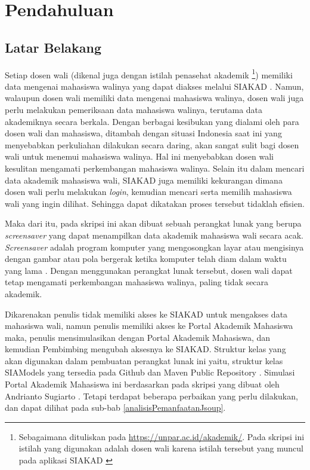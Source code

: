 \chapter{Pendahuluan}
\label{chap:intro}
   
\section{Latar Belakang}
\label{sec:label}

Setiap dosen wali (dikenal juga dengan istilah penasehat akademik \footnote{Sebagaimana dituliskan pada \url{https://unpar.ac.id/akademik/}. Pada skripsi ini istilah yang digunakan adalah dosen wali karena istilah tersebut yang muncul pada aplikasi SIAKAD \cite{siakad}}) memiliki data mengenai mahasiswa walinya yang dapat diakses melalui SIAKAD \cite{siakad}. Namun, walaupun dosen wali memiliki data mengenai mahasiswa walinya, dosen wali juga perlu melakukan pemeriksaan data mahasiswa walinya, terutama data akademiknya secara berkala. Dengan berbagai kesibukan yang dialami oleh para dosen wali dan mahasiswa, ditambah dengan situasi Indonesia saat ini yang menyebabkan perkuliahan dilakukan secara daring, akan sangat sulit bagi dosen wali untuk menemui mahasiswa walinya. Hal ini menyebabkan dosen wali kesulitan mengamati perkembangan mahasiswa walinya. Selain itu dalam mencari data akademik mahasiswa wali, SIAKAD juga memiliki kekurangan dimana dosen wali perlu melakukan \textit{login}, kemudian mencari serta memilih mahasiswa wali yang ingin dilihat. Sehingga dapat dikatakan proses tersebut tidaklah efisien.

Maka dari itu, pada skripsi ini akan dibuat sebuah perangkat lunak yang berupa \textit{screensaver} yang dapat menampilkan data akademik mahasiswa wali secara acak. \textit{Screensaver} adalah program komputer yang mengosongkan layar atau mengisinya dengan gambar atau pola bergerak ketika komputer telah diam dalam waktu yang lama \cite{screensaver}. Dengan menggunakan perangkat lunak tersebut, dosen wali dapat tetap mengamati perkembangan mahasiswa walinya, paling tidak secara akademik.

Dikarenakan penulis tidak memiliki akses ke SIAKAD untuk mengakses data mahasiswa wali, namun penulis memiliki akses ke Portal Akademik Mahasiswa \cite{stupor} maka, penulis mensimulasikan dengan Portal Akademik Mahasiswa, dan kemudian Pembimbing mengubah aksesnya ke SIAKAD. Struktur kelas yang akan digunakan dalam pembuatan perangkat lunak ini yaitu, struktur kelas SIAModels yang tersedia pada Github dan Maven Public Repository \cite{siamodels}. Simulasi Portal Akademik Mahasiswa ini berdasarkan pada skripsi yang dibuat oleh Andrianto Sugiarto \cite{ifstupor}. Tetapi terdapat beberapa perbaikan yang perlu dilakukan, dan dapat dilihat pada sub-bab \ref{analisisPemanfaatanJsoup}.

